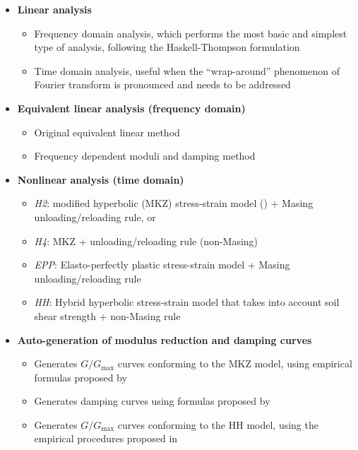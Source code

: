 \documentclass[11pt,letterpaper]{article}
\begin{document}
\begin{itemize}
    \item \textbf{\textsf{Linear analysis}}
        \begin{itemize}
            \item Frequency domain analysis, which performs the most basic and simplest type of analysis, following the Haskell-Thompson formulation \citep{Haskell_1953,Thomson_1950}
            \item Time domain analysis, useful when the ``wrap-around'' phenomenon of Fourier transform is pronounced and needs to be addressed
        \end{itemize}
    \item \textbf{\textsf{Equivalent linear analysis (frequency domain)}}
        \begin{itemize}
            \item Original \cite{Seed_Idriss_1970_techreport} equivalent linear method
            \item Frequency dependent moduli and damping method \citep{Assimaki_Kausel_2002}
        \end{itemize}
    \item \textbf{\textsf{Nonlinear analysis (time domain)}}
        \begin{itemize}
            \item \emph{H2}: modified hyperbolic (MKZ) stress-strain model (\citealp{Matasovic_Vucetic_1993}) + Masing unloading/reloading rule, or
            \item \emph{H4}: MKZ + \cite{Muravskii_2005} unloading/reloading rule (non-Masing)
            \item \emph{EPP}: Elasto-perfectly plastic stress-strain model + Masing unloading/reloading rule
            \item \emph{HH}: Hybrid hyperbolic stress-strain model \citep{Shi_Asimaki_2017} that takes into account soil shear strength + non-Masing rule
        \end{itemize}
    \item \textbf{\textsf{Auto-generation of modulus reduction and damping curves}}
        \begin{itemize}
            \item Generates $G/G_{\text{max}}$ curves conforming to the MKZ model, using empirical formulas proposed by \cite{Darendeli_2001}
            \item Generates damping curves using formulas proposed by \cite{Darendeli_2001}
            \item Generates $G/G_{\text{max}}$ curves conforming to the HH model, using the empirical procedures proposed in \cite{Shi_Asimaki_2017}

\end{itemize}
\end{itemize}
\end{document}
